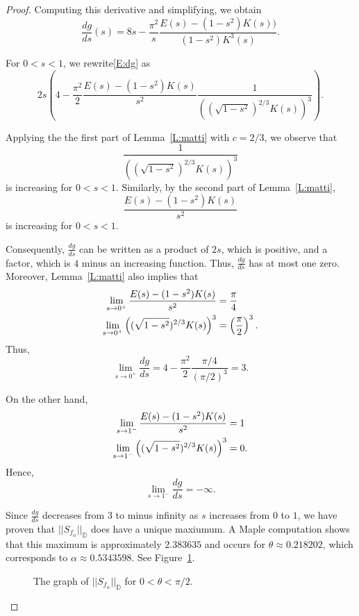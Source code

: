 \documentclass{lms}
\newcommand{\D}{\mathbb D}
\newcommand{\norm}[1]{\lvert\lvert#1\rvert\rvert}
\numberwithin{equation}{section}
\begin{document}
\begin{proof}
Computing this derivative and simplifying, we obtain
\begin{equation}\label{E:dg}
\frac{dg}{ds}(s)= 8s - 
\frac{\pi^2}{s}\frac{
E\left(s\right)-(1-s^2)K( s))}{(1-s^2)K^3({s})}.
\end{equation}

For $0<s<1$, we rewrite\eqref{E:dg} as
\[
2s\left( 4-\frac{\pi^2}{2}\frac{E(s)-(1-s^2)K(s)}{s^2}
\frac{1}{\left((\sqrt{1-s^2})^{2/3} K(s)\right)^{3}}\right).
\]



Applying the the first part of Lemma~\ref{L:matti} with $c=2/3$,
we observe that
\[
\frac{1}{\left((\sqrt{1-s^2})^{2/3} K(s)\right)^{3}}
\]
is increasing for $0<s<1$.
Similarly, by the second part of Lemma~\ref{L:matti}, 
\[
\frac{E(s)-(1-s^2)K(s)}{s^2}
\]
is increasing for $0<s<1$.

Consequently, $\frac{dg}{ds}$ can be 
written as  a product of $2s$, which is positive, and a factor, which is 
$4$ minus an increasing function.  Thus, $\frac{dg}{ds}$ has at most one zero.
Moreover, Lemma~\ref{L:matti} also implies that
\begin{align}
\lim_{s\to 0^+}\frac{E(s)-(1-s^2)K(s)}{s^2} &=\frac{\pi}{4} \\\notag 
\lim_{s\to 0^+} {\left((\sqrt{1-s^2})^{2/3} K(s)\right)^{3}}
&= \left(\frac{\pi}{2}\right)^{3}.
\end{align}
Thus,
\[
\lim_{s\to 0^+} \frac{dg}{ds} = 4-\frac{\pi^2}{2}\frac{\pi/4}{(\pi/2)^3} =3.
\]

On the other hand, 
\begin{align}
\lim_{s\to 1^-}\frac{E(s)-(1-s^2)K(s)}{s^2} &= 1 \\\notag
\lim_{s\to 1^-} {\left((\sqrt{1-s^2})^{2/3} K(s)\right)^{3}}
&= 0.
\end{align}
Hence,
\[
\lim_{s\to 1^-}\frac{dg}{ds} = -\infty.
\]



Since $\frac{dg}{ds}$ 
decreases from $3$ to minus infinity as $s$ increases from $0$ to $1$,
 we have proven that
$\norm{S_{f_\alpha}}_\D$ does have a unique maxiumum.  
A Maple computation shows
that this maximum is approximately $2.383635$ 
and occurs for $\theta\approx 0.218202$,
which corresponds to $\alpha\approx 0.5343598$.  See Figure~\ref{F:t-running}.



\begin{figure}
\begin{center}
\caption{The graph of $\norm{S_{f_\alpha}}_\D$ for  $0<\theta<\pi/2$.}
\label{F:t-running}
\end{center}
\end{figure}

\end{proof}
\end{document}
